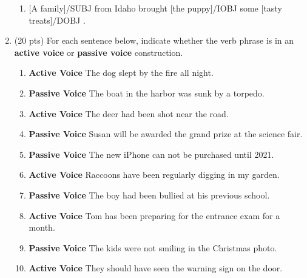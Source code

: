 \documentclass[11pt]{article}
\begin{document}
\begin{enumerate}
\begin{enumerate}
  \item {[A family]}/SUBJ from Idaho brought {[the puppy]}/IOBJ some {[tasty treats]}/DOBJ . 
    
  \end{enumerate}


\newpage

\item (20 pts) For each sentence below, indicate whether the verb
  phrase is in an {\bf active voice} or {\bf passive voice}
  construction.  

\begin{enumerate}

\item \textbf{Active Voice} The dog slept by the fire all night.

\item \textbf{Passive Voice} The boat in the harbor was sunk by a torpedo.

\item \textbf{Active Voice} The deer had been shot near the road.

\item \textbf{Passive Voice} Susan will be awarded the grand prize at the science fair.

\item \textbf{Passive Voice} The new iPhone can not be purchased until 2021.

\item \textbf{Active Voice} Raccoons have been regularly digging in my garden. 

\item \textbf{Passive Voice} The boy had been bullied at his previous school.
 
\item \textbf{Active Voice} Tom has been preparing for the entrance exam for a month.

\item \textbf{Passive Voice} The kids were not smiling in the Christmas photo.

\item \textbf{Active Voice} They should have seen the warning sign on the door.


\end{enumerate}


\newpage


\end{enumerate}
\end{document}
